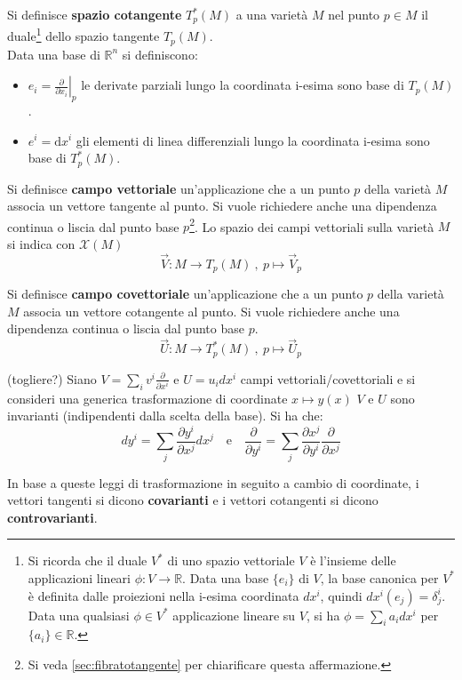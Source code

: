 Si definisce \textbf{spazio cotangente} $T_p^*(M)$ a una varietà $M$ nel punto
$p \in M$ il duale\footnote{Si ricorda che il duale $V^*$ di uno spazio vettoriale $V$ è l'insieme
delle applicazioni lineari $\phi : V \to \mathbb{R}$. Data una base $\{e_i\}$ di $V$,
la base canonica per $V^*$ è definita dalle proiezioni nella i-esima coordinata $dx^i$,
quindi $dx^i(e_j)=\delta^i_j$. Data una qualsiasi $\phi\in V^*$ applicazione lineare
su $V$, si ha $\phi = \sum_i a_i dx^i$ per $\{a_i\}\in\mathbb{R}$. }
dello spazio tangente $T_p(M)$.\\

Data una base di $\mathbb{R}^n$ si definiscono:
\begin{itemize}
   \item $ e_i = \left. \frac{\partial}{\partial x_i}\right |_p $
      le derivate parziali lungo la coordinata i-esima sono base di $T_p(M)$.
   \item $ e^i = \mathrm{d}x^i $ gli elementi di linea differenziali lungo la
      coordinata i-esima sono base di $T_p^*(M)$.
\end{itemize}

Si definisce \textbf{campo vettoriale} un'applicazione che a un punto $p$
della varietà $M$ associa un vettore tangente al punto. Si vuole richiedere anche
una dipendenza continua o liscia dal punto base $p$\footnote{Si veda \ref{sec:fibratotangente}
per chiarificare questa affermazione.}.
Lo spazio dei campi vettoriali sulla varietà $M$ si indica con $\mathcal{X}(M)$
$$ \vec V : M \to T_p(M) \: ,\: p \mapsto \vec V _p $$

Si definisce \textbf{campo covettoriale} un'applicazione che a un punto $p$
della varietà $M$ associa un vettore cotangente al punto. Si vuole richiedere anche
una dipendenza continua o liscia dal punto base $p$.
$$ \vec U : M \to T_p^*(M) \: ,\: p \mapsto \vec U _p $$

(togliere?)
Siano $V = \sum_i v^i\frac{\partial}{\partial x^i}$ e $U = u_i dx^i$ campi
vettoriali/covettoriali e si consideri una generica trasformazione di coordinate
$x \mapsto y(x)$ $V$ e $U$ sono invarianti (indipendenti dalla scelta della base).
Si ha che:
$$
   dy^i = \sum_j \frac{\partial y^i}{\partial x^j} dx^j \mathrm{\quad e \quad}
   \frac{\partial}{\partial y^i} = \sum_j \frac{\partial x^j}{\partial y^i}
      \frac{\partial }{\partial x^j}
$$

In base a queste leggi di trasformazione in seguito a cambio di coordinate,
i vettori tangenti si dicono \textbf{covarianti} e i vettori cotangenti
si dicono \textbf{controvarianti}.\\

